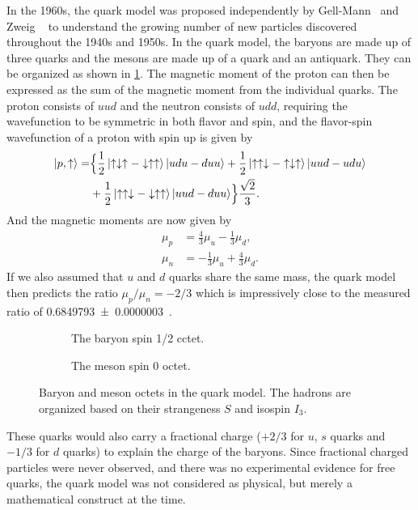 \documentclass[../main.tex]{subfiles}
\begin{document}
In the 1960s, the quark model was proposed independently by Gell-Mann~\cite{gell-mann1964} and Zweig ~\cite{zweig1964a, zweig1964}
to understand the growing number of new particles discovered throughout the 1940s and 1950s.
In the quark model, the baryons are made up of three quarks and the mesons are made up
of a quark and an antiquark. They can be organized as shown in \cref{fig:Octet}.
The magnetic moment of the proton can then be expressed as the sum of the magnetic moment
from the individual quarks. The proton consists of $uud$ and the neutron consists of $udd$,
requiring the wavefunction to be symmetric in both flavor and spin, and the flavor-spin wavefunction of a proton with
spin up is given by
\begin{equation}
	\begin{split}
		\ket{p,\uparrow}= & \Bigl\{\frac{1}{2}\ket{\uparrow\downarrow\uparrow-\downarrow\uparrow\uparrow}\ket{udu-duu} + \frac{1}{2}\ket{\uparrow\uparrow\downarrow-\uparrow\downarrow\uparrow}\ket{uud-udu} \\
		                  & +\frac{1}{2}\ket{\uparrow\uparrow\downarrow-\downarrow\uparrow\uparrow}\ket{uud-duu}\Bigr\} \frac{\sqrt{2}}{3}.
	\end{split}
\end{equation}
And the magnetic moments are now given by
\begin{align}
	\mu_p & = \frac{4}{3}\mu_u-\frac{1}{3}\mu_d,  \\
	\mu_n & = -\frac{1}{3}\mu_u+\frac{4}{3}\mu_d.
\end{align}
If we also assumed that $u$ and $d$ quarks share the same mass, the quark model
then predicts the ratio $\mu_p/\mu_n=-2/3$ which is impressively close to the measured ratio of
\num{0.6849793(3)}~\cite{workman2022}.
\begin{figure}[h!]
	\centering
	\begin{subfigure}{0.45\linewidth}
		
		\caption{The baryon spin 1/2 cctet.}
	\end{subfigure}
	\hspace{3mm}%
	\begin{subfigure}{0.45\linewidth}
		
		\caption{The meson spin 0 octet.}
	\end{subfigure}
	\caption{Baryon and meson octets in the quark model.
		The hadrons are organized based on their strangeness $S$ and isospin $I_3$.}
	\label{fig:Octet}
\end{figure}
These quarks would also carry a fractional charge ($+2/3$ for $u$, $s$ quarks and $-1/3$ for $d$ quarks) to
explain the charge of the baryons. Since fractional charged particles were never observed, and there was
no experimental evidence for free quarks, the quark model was not considered as physical, but merely a mathematical construct at the time.
\end{document}
